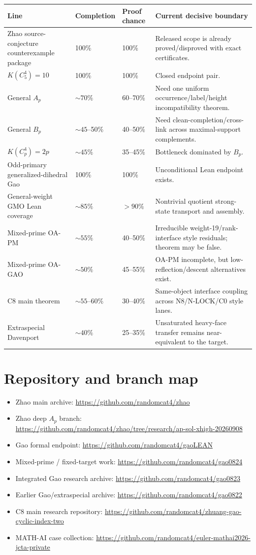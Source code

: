 \documentclass[11pt,a4paper]{ctexart}
\begin{document}
\begin{longtable}{p{}p{}p{}p{}}
\toprule
Line & Completion & Proof chance & Current decisive boundary\\
\midrule
\endhead
Zhao source-conjecture counterexample package & 100\% & 100\% & Released scope is already proved/disproved with exact certificates.\\
$K(C_5^4)=10$ & 100\% & 100\% & Closed endpoint pair.\\
General $A_p$ & $\sim70\%$ & 60--70\% & Need one uniform occurrence/label/height incompatibility theorem.\\
General $B_p$ & $\sim45$--50\% & 40--50\% & Need clean-completion/cross-link across maximal-support complements.\\
$K(C_p^4)=2p$ & $\sim45\%$ & 35--45\% & Bottleneck dominated by $B_p$.\\
Odd-primary generalized-dihedral Gao & 100\% & 100\% & Unconditional Lean endpoint exists.\\
General-weight GMO Lean coverage & $\sim85\%$ & $>90\%$ & Nontrivial quotient strong-state transport and assembly.\\
Mixed-prime OA-PM & $\sim55\%$ & 40--50\% & Irreducible weight-19/rank-interface style residuals; theorem may be false.\\
Mixed-prime OA-GAO & $\sim50\%$ & 45--55\% & OA-PM incomplete, but low-reflection/descent alternatives exist.\\
C8 main theorem & $\sim55$--60\% & 30--40\% & Same-object interface coupling across N8/N-LOCK/C0 style lanes.\\
Extraspecial Davenport & $\sim40\%$ & 25--35\% & Unsaturated heavy-face transfer remains near-equivalent to the target.\\
\bottomrule
\end{longtable}

\section{Repository and branch map}

\begin{itemize}
\item Zhao main archive: \url{https://github.com/randomcat4/zhao}
\item Zhao deep $A_p$ branch: \url{https://github.com/randomcat4/zhao/tree/research/ap-sol-xhigh-20260908}
\item Gao formal endpoint: \url{https://github.com/randomcat4/gaoLEAN}
\item Mixed-prime / fixed-target work: \url{https://github.com/randomcat4/gao0824}
\item Integrated Gao research archive: \url{https://github.com/randomcat4/gao0823}
\item Earlier Gao/extraspecial archive: \url{https://github.com/randomcat4/gao0822}
\item C8 main research repository: \url{https://github.com/randomcat4/zhuang-gao-cyclic-index-two}
\item MATH-AI case collection: \url{https://github.com/randomcat4/euler-mathai2026-jcta-private}
\end{itemize}
\end{document}
